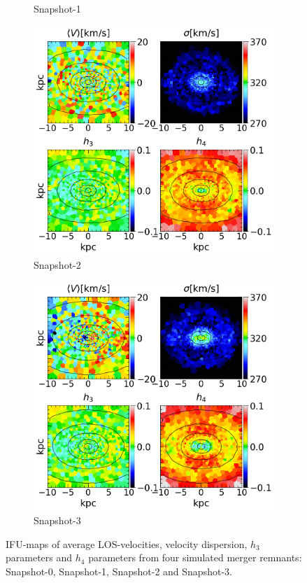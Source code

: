 \documentclass[english, oneside]{HYgradu}
\begin{document}
\begin{figure}
\begin{subfigure}[b]{0.49\textwidth}
		\caption{Snapshot-1}
	\end{subfigure}
	\begin{subfigure}[b]{0.49\textwidth}
		\includegraphics[width=\textwidth]{BH_2.png}
		\caption{Snapshot-2}
	\end{subfigure}
	\begin{subfigure}[b]{0.49\textwidth}
		\includegraphics[width=\textwidth]{BH_3.png}
		\caption{Snapshot-3}
	\end{subfigure}
	\caption{IFU-maps of average LOS-velocities, velocity dispersion, $h_3$ parameters and $h_4$ parameters from four simulated merger remnants: Snapshot-0, Snapshot-1, Snapshot-2 and Snapshot-3.}
\end{figure}
\end{document}

